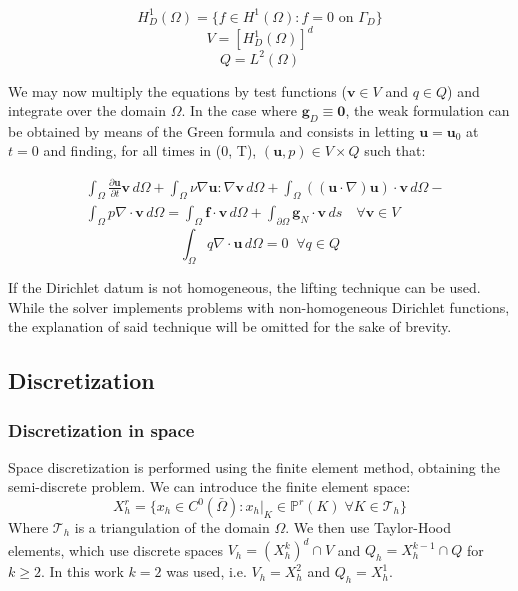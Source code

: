 \begin{equation}
    H^1_D(\Omega) = \{f \in H^1(\Omega) : f = 0 \text{ on } \Gamma_D\}
\end{equation}
\begin{equation}
    V = [H^1_D(\Omega)]^d
\end{equation}
\begin{equation}
    Q = L^2(\Omega)
\end{equation}

We may now multiply the equations by test functions ($\mathbf{v} \in V$ and $q \in Q$) and integrate over the domain $\Omega$. In the case where $\mathbf{g}_D \equiv \mathbf{0}$, the weak formulation can be obtained by means of the Green formula and consists in letting $\mathbf{u} = \mathbf{u}_0$ at $t=0$ and finding, for all times in (0, T), $(\mathbf{u}, p) \in V \times Q$ such that:

\begin{equation}\label{eq:momentum_weak}
    \begin{split}
        & \int_{\Omega} \frac{\partial \mathbf{u}}{\partial t} \mathbf{v} \, d\Omega + \int_{\Omega} \nu \nabla \mathbf{u} : \nabla \mathbf{v} \, d\Omega + \int_{\Omega} ((\mathbf{u} \cdot \nabla) \mathbf{u}) \cdot \mathbf{v} \, d\Omega - \\
        & \int_{\Omega} p \nabla \cdot \mathbf{v} \, d\Omega = \int_{\Omega} \mathbf{f} \cdot \mathbf{v} \, d\Omega + \int_{\partial \Omega} \mathbf{g}_N \cdot \mathbf{v} \, ds \quad \forall \mathbf{v} \in V
    \end{split}
\end{equation}
\begin{equation}\label{eq:continuity_weak}
    \int_{\Omega} q \nabla \cdot \mathbf{u} \, d \Omega = 0 \;\; \forall q \in Q
\end{equation}

If the Dirichlet datum is not homogeneous, the lifting technique can be used. While the solver implements problems with non-homogeneous Dirichlet functions, the explanation of said technique will be omitted for the sake of brevity.

\subsection{Discretization}
\subsubsection{Discretization in space}
Space discretization is performed using the finite element method, obtaining the semi-discrete problem. We can introduce the finite element space:
\begin{equation}
    X_h^r = \{x_h \in C^0(\bar\Omega) : x_h|_K \in \mathbb{P}^r(K) \; \forall K \in \mathcal{T}_h\}
\end{equation}
Where $\mathcal{T}_h$ is a triangulation of the domain $\Omega$. We then use Taylor-Hood elements, which use discrete spaces $V_h = (X_h^k)^d \cap V$ and $Q_h = X_h^{k-1} \cap Q$ for $k \geq 2$. In this work $k = 2$ was used, i.e. $V_h = X_h^2$ and $Q_h = X_h^1$.


